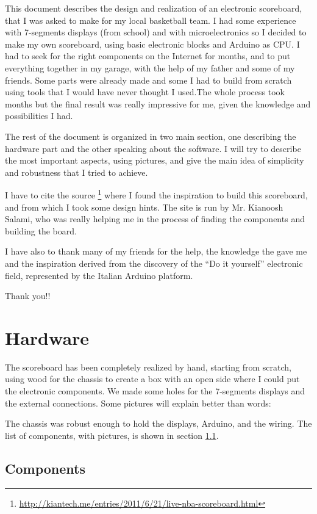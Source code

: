 \documentclass[11pt,english]{article}
\begin{document}
This document describes the design and realization of an electronic scoreboard, 
that I was asked to make for my local basketball team. I had some experience with 
7-segments displays (from school) and with microelectronics so I decided to make 
my own scoreboard, using basic electronic blocks and Arduino as CPU. I had to seek 
for the right components on the Internet for months, and to put everything together 
in my garage, with the help of my father and some of my friends. Some parts were 
already made and some I had to build from scratch using tools that I would have never 
thought I used.The whole process took months but the final result was really 
impressive for me, given the knowledge and possibilities I had.

The rest of the document is organized in two main section, one describing the hardware 
part and the other speaking about the software. I will try to describe the most 
important aspects, using pictures, and give the main idea of simplicity and robustness 
that I tried to achieve.

I have to cite the source \footnote{\url{http://kiantech.me/entries/2011/6/21/live-nba-scoreboard.html}} 
where I found the inspiration to build this scoreboard, and from which I took some 
design hints. The site is run by Mr. Kianoosh Salami, who was really helping me in the 
process of finding the components and building the board.

I have also to thank many of my friends for the help, the knowledge the gave me and the
inspiration derived from the discovery of the \textquotedblleft Do it yourself\textquotedblright 
electronic field, represented by the Italian Arduino platform.   

Thank you!!

\section{Hardware}

The scoreboard has been completely realized by hand, starting from scratch, using wood 
for the chassis to create a box with an open side where I could put the electronic 
components. We made some holes for the 7-segments displays and the external connections.
Some pictures will explain better than words:

The chassis was robust enough to hold the displays, Arduino, and the wiring.
The list of components, with pictures, is shown in section \ref{subsec:components}.


\subsection{Components}\label{subsec:components}
\end{document}
